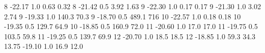 8   -22.17   1.0   0.63 0.32
8   -21.42   0.5   3.92 1.63
9   -22.30   1.0   0.17 0.17
9   -21.30   1.0   3.02 2.74
9   -19.33   1.0   140.3 70.3
9   -18.70   0.5   489.1 716
10   -22.57   1.0   0.18 0.18
10   -19.35   0.5   129.7 64.9
10   -18.85   0.5   160.9 72.0
11   -20.60   1.0   17.0 17.0
11   -19.75   0.5   103.5 59.8
11   -19.25   0.5   139.7 69.9
12   -20.70   1.0   18.5 18.5
12   -18.85   1.0   59.3 34.3
13.75   -19.10   1.0   16.9 12.0
